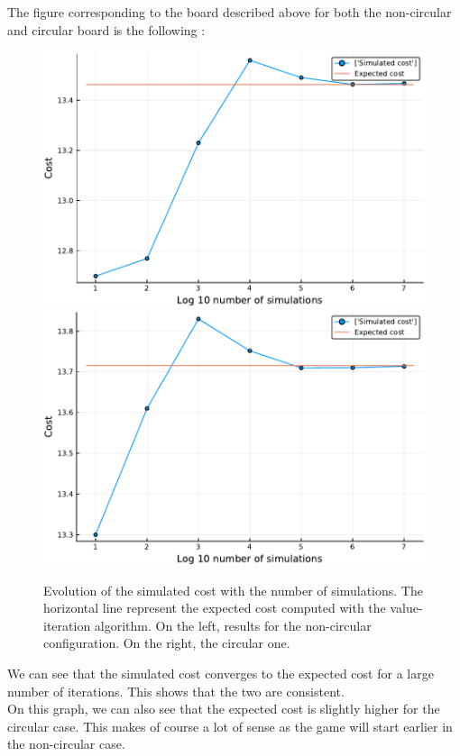 The figure corresponding to the board described above for both the non-circular and circular board is the following :
\begin{figure}[H]
\centering
\includegraphics[scale=0.47]{../img/board_unif_low/cost_iterations_log_noncirc.pdf}
\includegraphics[scale=0.47]{../img/board_unif_low/cost_iterations_log_circ.pdf}
\caption{Evolution of the simulated cost with the number of simulations. The horizontal line represent the expected cost computed with the value-iteration algorithm. On the left, results for the non-circular configuration. On the right, the circular one.}
\label{fig:cost_iterations_log}
\end{figure}

We can see that the simulated cost converges to the expected cost for a large number of iterations.
This shows that the two are consistent. \\
On this graph, we can also see that the expected cost is slightly higher for the circular case. 
This makes of course a lot of sense as the game will start earlier in the non-circular case. 

